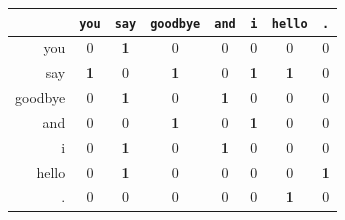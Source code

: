 {\renewcommand{\arraystretch}{1.25}\setlength{\tabcolsep}{7pt}%
\begin{tabular}{>{\ttfamily\columncolor{tokc!12}}r|ccccccc}
 & \texttt{you} & \texttt{say} & \texttt{goodbye} & \texttt{and} & \texttt{i} & \texttt{hello} & \texttt{.} \\ \hline
you     & 0 & \textbf{1} & 0 & 0 & 0 & 0 & 0 \\
say     & \textbf{1} & 0 & \textbf{1} & 0 & \textbf{1} & \textbf{1} & 0 \\
goodbye & 0 & \textbf{1} & 0 & \textbf{1} & 0 & 0 & 0 \\
and     & 0 & 0 & \textbf{1} & 0 & \textbf{1} & 0 & 0 \\
i       & 0 & \textbf{1} & 0 & \textbf{1} & 0 & 0 & 0 \\
hello   & 0 & \textbf{1} & 0 & 0 & 0 & 0 & \textbf{1} \\
.       & 0 & 0 & 0 & 0 & 0 & \textbf{1} & 0 \\
\end{tabular}}

